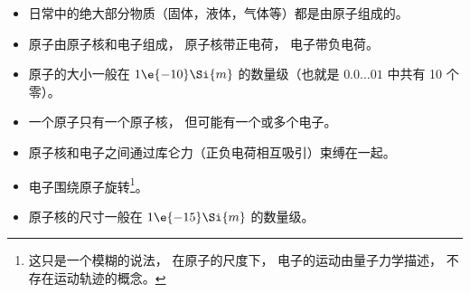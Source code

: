 
\begin{issues}
\issueDraft
\end{issues}

\begin{itemize}
\item 日常中的绝大部分物质（固体，液体，气体等）都是由原子组成的。
\item 原子由原子核和电子组成， 原子核带正电荷， 电子带负电荷。
\item 原子的大小一般在 $1\e{-10}\Si{m}$ 的数量级（也就是 $0.0\dots01$ 中共有 10 个零）。
\item 一个原子只有一个原子核， 但可能有一个或多个电子。
\item 原子核和电子之间通过库仑力（正负电荷相互吸引）束缚在一起。
\item 电子围绕原子旋转\footnote{这只是一个模糊的说法， 在原子的尺度下， 电子的运动由量子力学描述， 不存在运动轨迹的概念。}。

\item 原子核的尺寸一般在 $1\e{-15}\Si{m}$ 的数量级。
\end{itemize}

